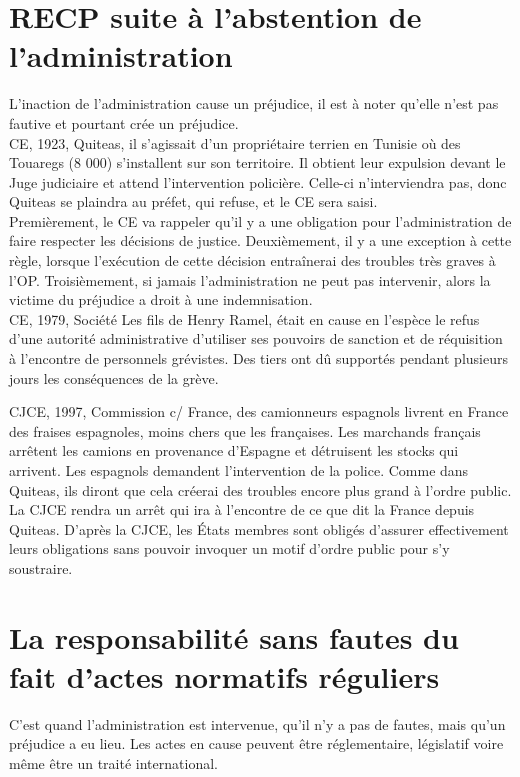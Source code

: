 \documentclass[10pt, a4paper, openany]{book}
\begin{document}
\section{RECP suite à l'abstention de l'administration}

L'inaction de l'administration cause un préjudice, il est à noter qu'elle n'est pas fautive et pourtant crée un préjudice. \\
CE, 1923, Quiteas, il s'agissait d'un propriétaire terrien en Tunisie où des Touaregs (8 000) s'installent sur son territoire. Il obtient leur expulsion devant le Juge judiciaire et attend l'intervention policière. Celle-ci n'interviendra pas, donc Quiteas se plaindra au préfet, qui refuse, et le CE sera saisi. \\
Premièrement, le CE va rappeler qu'il y a une obligation pour l'administration de faire respecter les décisions de justice. Deuxièmement, il y a une exception à cette règle, lorsque l'exécution de cette décision entraînerai des troubles très graves à l'OP. Troisièmement, si jamais l'administration ne peut pas intervenir, alors la victime du préjudice a droit à une indemnisation. \\
CE, 1979, Société Les fils de Henry Ramel, était en cause en l'espèce le refus d'une autorité administrative d'utiliser ses pouvoirs de sanction et de réquisition à l'encontre de personnels grévistes. Des tiers ont dû supportés pendant plusieurs jours les conséquences de la grève.


CJCE, 1997, Commission c/ France, des camionneurs espagnols livrent en France des fraises espagnoles, moins chers que les françaises. Les marchands français arrêtent les camions en provenance d'Espagne et détruisent les stocks qui arrivent. Les espagnols demandent l'intervention de la police. Comme dans Quiteas, ils diront que cela créerai des troubles encore plus grand à l'ordre public. \\
La CJCE rendra un arrêt qui ira à l'encontre de ce que dit la France depuis Quiteas. D'après la CJCE, les États membres sont obligés d'assurer effectivement leurs obligations sans pouvoir invoquer un motif d'ordre public pour s'y soustraire. 

\section{La responsabilité sans fautes du fait d'actes normatifs réguliers}

C'est quand l'administration est intervenue, qu'il n'y a pas de fautes, mais qu'un préjudice a eu lieu. Les actes en cause peuvent être réglementaire, législatif voire même être un traité international. 
\end{document}
